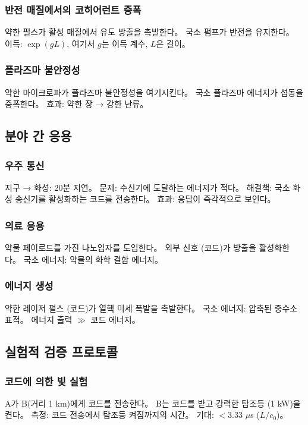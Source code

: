 \documentclass[11pt,a4paper]{article}
\begin{document}
\subsubsection{반전 매질에서의 코히어런트 증폭}
약한 펄스가 활성 매질에서 유도 방출을 촉발한다。 국소 펌프가 반전을 유지한다。 이득: $\exp(gL)$, 여기서 $g$는 이득 계수, $L$은 길이。

\subsubsection{플라즈마 불안정성}
약한 마이크로파가 플라즈마 불안정성을 여기시킨다。 국소 플라즈마 에너지가 섭동을 증폭한다。 효과: 약한 장 → 강한 난류。

\subsection{분야 간 응용}

\subsubsection{우주 통신}
지구 → 화성: 20분 지연。 문제: 수신기에 도달하는 에너지가 적다。 해결책: 국소 화성 송신기를 활성화하는 코드를 전송한다。 효과: 응답이 즉각적으로 보인다。

\subsubsection{의료 응용}
약물 페이로드를 가진 나노입자를 도입한다。 외부 신호 (코드)가 방출을 활성화한다。 국소 에너지: 약물의 화학 결합 에너지。

\subsubsection{에너지 생성}
약한 레이저 펄스 (코드)가 열핵 미세 폭발을 촉발한다。 국소 에너지: 압축된 중수소 표적。 에너지 출력 $\gg$ 코드 에너지。

\subsection{실험적 검증 프로토콜}

\subsubsection{코드에 의한 빛 실험}
A가 B(거리 1 km)에게 코드를 전송한다。 B는 코드를 받고 강력한 탐조등 (1 kW)을 켠다。 측정: 코드 전송에서 탐조등 켜짐까지의 시간。 기대: $< 3.33$ $\mu$s ($L/c_0$)。
\end{document}
